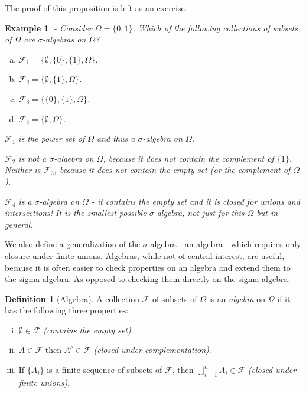 \documentclass{book}
\theoremstyle{plain}%
\newtheorem{prototheorem}{Example}[section]
\newenvironment{cexample}
   {\colorlet{shadecolor}{gray!10}\begin{shaded}\begin{prototheorem}}
   {\end{prototheorem}\end{shaded}}
\theoremstyle{definition}
\newtheorem{definition}{Definition}[section]
\begin{document}
The proof of this proposition is left as an exercise.

\begin{cexample}{}{-}
Consider $\Omega = \{0, 1\}$. Which of the following collections of subsets of $\Omega$ are $\sigma$-algebras on $\Omega$?

\begin{enumerate}[(a)]
\item $\mathcal{F}_1 = \{\emptyset, \{0\}, \{1\},\Omega\}$. 
\item $\mathcal{F}_2 = \{\emptyset, \{1\},\Omega\}$.
\item $\mathcal{F}_3 = \{\{0\}, \{1\},\Omega\}$.
\item $\mathcal{F}_4 = \{\emptyset, \Omega\}$. 
\end{enumerate}

$\mathcal{F}_1$ is the power set of $\Omega$ and thus a $\sigma$-algebra on $\Omega$.

$\mathcal{F}_2$ is not a $\sigma$-algebra on $\Omega$, because it does not contain the complement of $\{1\}$. Neither is $\mathcal{F}_3$, because it does not contain the empty set (or the complement of $\Omega$).

$\mathcal{F}_4$ is a $\sigma$-algebra on $\Omega$ - it contains the empty set and it is closed for unions and intersections! It is the smallest possible $\sigma$-algebra, not just for this $\Omega$ but in general.

\end{cexample}

We also define a generalization of the $\sigma$-algebra - an algebra - which requires only closure under finite unions. Algebras, while not of central interest, are useful, because it is often easier to check properties on an algebra and extend them to the sigma-algebra. As opposed to checking them directly on the sigma-algebra.

\begin{definition}[Algebra]
A collection $\mathcal{F}$ of subsets of $\Omega$ is an \emph{algebra} on $\Omega$ if it has the following three properties:

\begin{enumerate}[(i)]
\item $\emptyset \in  \mathcal{F}$ \textit{(contains the empty set)}.
\item $A \in \mathcal{F}$ then $A^c \in \mathcal{F}$ \textit{(closed under complementation)}.
\item If $\{A_i\}$ is a finite sequence of subsets of $\mathcal{F}$,  then $\bigcup_{i=1}^n A_i \in \mathcal{F}$ \textit{(closed under finite unions)}.
\end{enumerate}
\end{definition}
\end{document}
